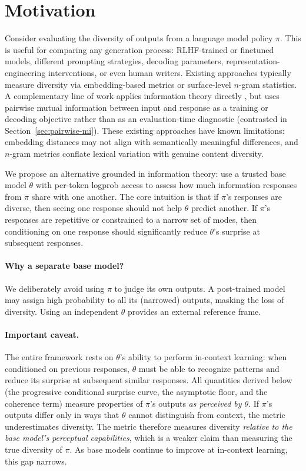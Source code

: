 \section{Motivation}\label{sec:motivation}

Consider evaluating the diversity of outputs from a language model policy $\pi$.
This is useful for comparing any generation process: RLHF-trained or finetuned models, different prompting strategies, decoding parameters, representation-engineering interventions, or even human writers.
Existing approaches typically measure diversity via embedding-based metrics \citep{du2019boosting} or surface-level $n$-gram statistics.
A complementary line of work applies information theory directly \citep{li2016diversity, zhang2018aim}, but uses pairwise mutual information between input and response as a training or decoding objective rather than as an evaluation-time diagnostic (contrasted in Section~\ref{sec:pairwise-mi}).
These existing approaches have known limitations: embedding distances may not align with semantically meaningful differences, and $n$-gram metrics conflate lexical variation with genuine content diversity.

We propose an alternative grounded in information theory: use a trusted base model $\theta$ with per-token logprob access to assess how much information responses from $\pi$ share with one another.
The core intuition is that if $\pi$'s responses are diverse, then seeing one response should not help $\theta$ predict another.
If $\pi$'s responses are repetitive or constrained to a narrow set of modes, then conditioning on one response should significantly reduce $\theta$'s surprise at subsequent responses.

\paragraph{Why a separate base model?} We deliberately avoid using $\pi$ to judge its own outputs.
A post-trained model may assign high probability to all its (narrowed) outputs, masking the loss of diversity.
Using an independent $\theta$ provides an external reference frame.

\paragraph{Important caveat.} The entire framework rests on $\theta$'s ability to perform in-context learning: when conditioned on previous responses, $\theta$ must be able to recognize patterns and reduce its surprise at subsequent similar responses.
All quantities derived below (the progressive conditional surprise curve, the asymptotic floor, and the coherence term) measure properties of $\pi$'s outputs \emph{as perceived by $\theta$}.
If $\pi$'s outputs differ only in ways that $\theta$ cannot distinguish from context, the metric underestimates diversity.
The metric therefore measures diversity \emph{relative to the base model's perceptual capabilities}, which is a weaker claim than measuring the true diversity of $\pi$.
As base models continue to improve at in-context learning, this gap narrows.

